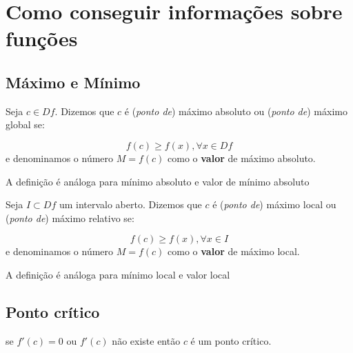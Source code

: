 \chapter{Como conseguir informações sobre funções}

\section{Máximo e Mínimo}

\begin{definition}
    Seja \(c \in Df\). Dizemos que \(c\) é (\textit{ponto de}) máximo absoluto ou (\textit{ponto de}) máximo global se:
    
    \begin{equation}
        f(c) \geq f(x), \forall x \in Df
    \end{equation}
    e denominamos o número \(M = f(c)\) como o \textbf{valor} de máximo absoluto.
\end{definition}

\begin{definition}
    A definição é análoga para mínimo absoluto e valor de mínimo absoluto
\end{definition}

\begin{definition}
    Seja \(I \subset Df\) um intervalo aberto. Dizemos que \(c\) é (\textit{ponto de}) máximo local ou (\textit{ponto de}) máximo relativo se:
    
    \begin{equation}
        f(c) \geq f(x), \forall x \in I
    \end{equation}
    e denominamos o número \(M = f(c)\) como o \textbf{valor} de máximo local.
\end{definition}

\begin{definition}
    A definição é análoga para mínimo local e valor local
\end{definition}

\section{Ponto crítico}

\begin{definition}
    se \(f'(c) = 0\) ou \(f'(c)\) não existe então \(c\) é um ponto crítico.
\end{definition}

